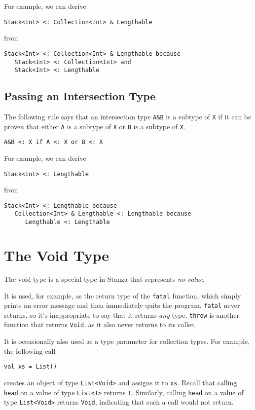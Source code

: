 \documentclass[10pt,oneside]{book}
\begin{document}
For example, we can derive
\begin{lstlisting}
Stack<Int> <: Collection<Int> & Lengthable
\end{lstlisting}
from
\begin{lstlisting}
Stack<Int> <: Collection<Int> & Lengthable because
   Stack<Int> <: Collection<Int> and
   Stack<Int> <: Lengthable
\end{lstlisting}

\subsection*{Passing an Intersection Type}
The following rule says that an intersection type \texttt{\frenchspacing A\&B} is a subtype of \texttt{\frenchspacing X} if it can be proven that either \texttt{\frenchspacing A} is a subtype of \texttt{\frenchspacing X} or \texttt{\frenchspacing B} is a subtype of \texttt{\frenchspacing X}.
\begin{lstlisting}
A&B <: X if A <: X or B <: X
\end{lstlisting}

For example, we can derive
\begin{lstlisting}
Stack<Int> <: Lengthable
\end{lstlisting}
from
\begin{lstlisting}
Stack<Int> <: Lengthable because
   Collection<Int> & Lengthable <: Lengthable because
      Lengthable <: Lengthable
\end{lstlisting}

\section{The Void Type}
The void type is a special type in Stanza that represents {\em no value}.

It is used, for example, as the return type of the \texttt{\frenchspacing fatal} function, which simply prints an error message and then immediately quits the program. \texttt{\frenchspacing fatal} never returns, so it's inappropriate to say that it returns {\em any} type. \texttt{\frenchspacing throw} is another function that returns \texttt{\frenchspacing Void}, as it also never returns to its caller.

It is occasionally also used as a type parameter for collection types. For example, the following call
\begin{lstlisting}
val xs = List()
\end{lstlisting}
creates an object of type \texttt{\frenchspacing List<Void>} and assigns it to \texttt{\frenchspacing xs}. Recall that calling \texttt{\frenchspacing head} on a value of type \texttt{\frenchspacing List<T>} returns \texttt{\frenchspacing T}. Similarly, calling \texttt{\frenchspacing head} on a value of type \texttt{\frenchspacing List<Void>} returns \texttt{\frenchspacing Void}, indicating that such a call would not return.
\end{document}
